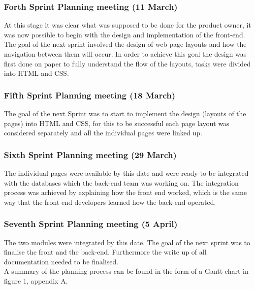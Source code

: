 \documentclass[journal]{IEEEtran}
\begin{document}
\hfill \break \subsubsection{Forth Sprint Planning meeting (11 March)}
At this stage it was clear what was supposed to be done for the product owner, it was now possible to begin with the design and implementation of the front-end. The goal of the next sprint involved the design of web page layouts and how the navigation between them will occur. In order to achieve this goal the design was first done on paper to fully understand the flow of the layouts, tasks were divided into HTML and CSS.
\hfill \break \subsubsection{Fifth Sprint Planning meeting (18 March)}
The goal of the next Sprint was to start to implement the design (layouts of the pages) into HTML and CSS, for this to be successful each page layout was considered separately and all the individual pages were linked up.
\hfill \break \subsubsection{Sixth Sprint Planning meeting (29 March)}
The individual pages were available by this date and were ready to be integrated with the databases which the back-end team was working on. The integration process was achieved by explaining how the front end worked, which is the same way that the front end developers learned how the back-end operated. 
\hfill \break \subsubsection{Seventh Sprint Planning meeting (5 April)}
 The two modules were integrated by this date. The goal of the next sprint was to finalise the front and the back-end.  Furthermore the write up of all documentation needed to be finalised. \\

A summary of the planning process can be found in the form of a Gantt chart in figure 1, appendix A.

\end{document}
